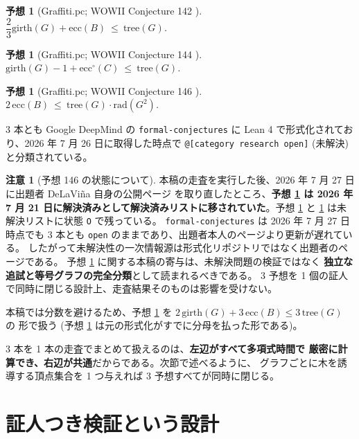 \documentclass[paper=a4,fontsize=10.5pt,jafontsize=10.5pt]{jlreq}
\theoremstyle{plain}
\newtheorem{conjecture}[theorem]{予想}
\theoremstyle{definition}
\newtheorem{remark}[theorem]{注意}
\begin{document}
\begin{conjecture}[Graffiti.pc; WOWII Conjecture 142 \cite{wowii}]\label{conj:142}
$\dfrac{2}{3}\mathrm{girth}(G) + \mathrm{ecc}(B) \ \le \ \mathrm{tree}(G)$.
\end{conjecture}

\begin{conjecture}[Graffiti.pc; WOWII Conjecture 144 \cite{wowii}]\label{conj:144}
$\mathrm{girth}(G) - 1 + \mathrm{ecc}^{\circ}(C) \ \le \ \mathrm{tree}(G)$.
\end{conjecture}

\begin{conjecture}[Graffiti.pc; WOWII Conjecture 146 \cite{wowii}]\label{conj:146}
$2\,\mathrm{ecc}(B) \ \le \ \mathrm{tree}(G) \cdot \mathrm{rad}(G^2)$.
\end{conjecture}

3 本とも Google DeepMind の \texttt{formal-conjectures} \cite{formalconj} に
Lean 4 で形式化されており、2026 年 7 月 26 日に取得した時点で
\texttt{@[category research open]} (未解決) と分類されている。

\begin{remark}[予想 146 の状態について]\label{rem:146}
本稿の走査を実行した後、2026 年 7 月 27 日に出題者 DeLaViña 自身の公開ページ
\cite{wowii} を取り直したところ、\textbf{予想 \ref{conj:146} は 2026 年 7 月
21 日に解決済みとして解決済みリストに移されていた}。予想 \ref{conj:142} と
\ref{conj:144} は未解決リストに状態 \texttt{O} で残っている。
\texttt{formal-conjectures} \cite{formalconj} は 2026 年 7 月 27 日時点でも
3 本とも \texttt{open} のままであり、出題者本人のページより更新が遅れている。
したがって未解決性の一次情報源は形式化リポジトリではなく出題者のページである。
予想 \ref{conj:146} に関する本稿の寄与は、未解決問題の検証ではなく
\textbf{独立な追試と等号グラフの完全分類}として読まれるべきである。
3 予想を 1 個の証人で同時に閉じる設計上、走査結果そのものは影響を受けない。
\end{remark}

本稿では分数を避けるため、予想 \ref{conj:142} を
$2\,\mathrm{girth}(G) + 3\,\mathrm{ecc}(B) \le 3\,\mathrm{tree}(G)$ の
形で扱う (予想 \ref{conj:146} は元の形式化がすでに分母を払った形である)。

3 本を 1 本の走査でまとめて扱えるのは、\textbf{左辺がすべて多項式時間で
厳密に計算でき、右辺が共通}だからである。次節で述べるように、
グラフごとに木を誘導する頂点集合を 1 つ与えれば 3 予想すべてが同時に閉じる。

\section{証人つき検証という設計}\label{sec:design}
\end{document}
